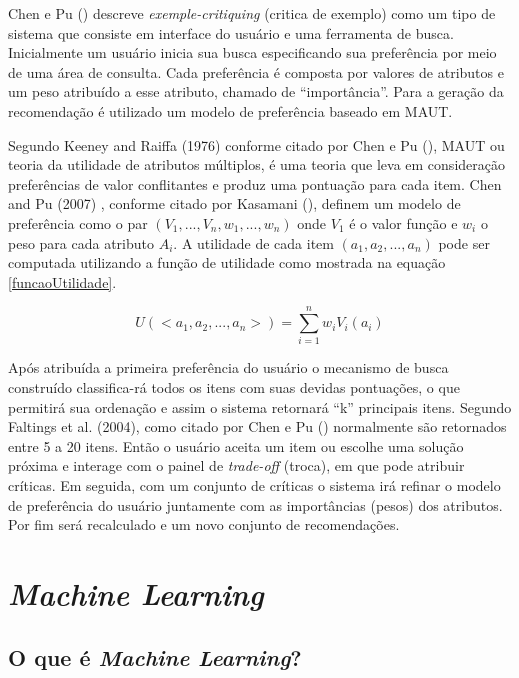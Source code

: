 Chen e Pu (\citeyear{Chen:2012}) descreve \textit{exemple-critiquing} (critica de exemplo) como um tipo de sistema que consiste em interface do usuário e uma ferramenta de busca. Inicialmente um usuário inicia sua busca especificando sua preferência por meio de uma área de consulta. Cada preferência é composta por valores de atributos e um peso atribuído a esse atributo, chamado de “importância”. Para a geração da recomendação é utilizado um modelo de preferência baseado em MAUT.

Segundo Keeney and Raiffa (1976) conforme citado por Chen e Pu (\citeyear{Chen:2012}), MAUT ou teoria da utilidade de atributos múltiplos, é uma teoria que leva em consideração preferências de valor conflitantes e produz uma pontuação para cada item. Chen and Pu (2007) , conforme citado por Kasamani (\citeyear{Kasamani:2017}), definem um modelo de preferência como o par \((V_1, ..., V_n, w_1, ..., w_n)\) onde \(V_1\) é o valor função e \(w_i\) o peso para cada atributo \(A_i\). A utilidade de cada item \((a_1, a_2, ..., a_n)\) pode ser computada utilizando a função de utilidade como mostrada na equação \eqref{funcaoUtilidade}.

\begin{equation}
    \label{funcaoUtilidade}
    U(<a_1,a_2,...,a_n>)=\sum_{i=1}^{n} w_i V_i(a_i)
\end{equation}

Após atribuída a primeira preferência do usuário o mecanismo de busca construído classifica-rá todos os itens com suas devidas pontuações, o que permitirá sua ordenação e assim o sistema retornará “k” principais itens. Segundo Faltings et al. (2004), como citado por Chen e Pu (\citeyear{Chen:2012}) normalmente são retornados entre 5 a 20 itens. Então o usuário aceita um item ou escolhe uma solução próxima e interage com o painel de \textit{trade-off} (troca), em que pode atribuir críticas. Em seguida, com um conjunto de críticas o sistema irá refinar o modelo de preferência do usuário juntamente com as importâncias (pesos) dos atributos. Por fim será recalculado e um novo conjunto de recomendações.

\section{\textit{Machine Learning}}
\label{machineLearning}
\subsection{O que é \textit{Machine Learning}?}

